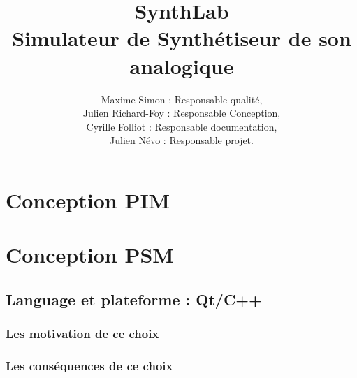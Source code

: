 \documentclass[a4paper,oneside,frenchb,12pt]{article}
\title{SynthLab\\Simulateur de Synthétiseur de son analogique}
\author{Maxime Simon : Responsable qualité,\\ Julien Richard-Foy : Responsable Conception,\\ Cyrille Folliot : Responsable documentation,\\Julien Névo : Responsable projet.}
\begin{document}
\maketitle
\section{Conception PIM}
\section{Conception PSM}
\subsection{Language et plateforme : Qt/C++}
\subsubsection{Les motivation de ce choix}
\subsubsection{Les conséquences de ce choix}
\end{document}
